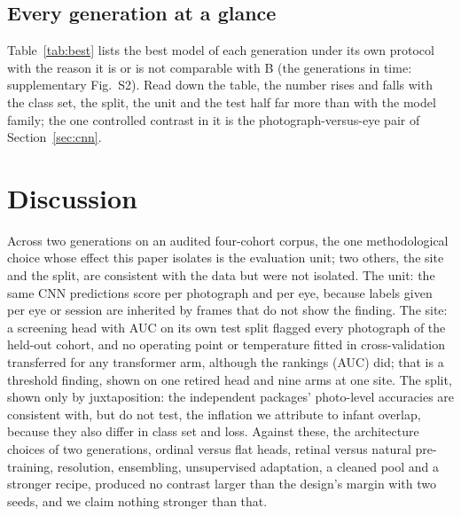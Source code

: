 \documentclass[journal]{IEEEtran}
\begin{document}
\subsection{Every generation at a glance}
Table~\ref{tab:best} lists the best model of each generation under its own protocol with the reason it is or is not comparable with B (the generations in time: supplementary Fig.~S2). Read down the table, the number rises and falls with the class set, the split, the unit and the test half far more than with the model family; the one controlled contrast in it is the photograph-versus-eye pair of Section~\ref{sec:cnn}.

\begin{table}[!t]
\caption{Every generation at a glance: the best model of each under its own protocol. Only one row is the project's selected model; every other row is listed with the reason its number cannot be read against it. Independent-package rows: four classes, photo-level split, test n\,=\,\mateTest{} (\mateMLTest{} for the classical package); CI: \mateCIkind{} (Wilson for the classical package).}
\label{tab:best}
\centering\scriptsize\setlength{\tabcolsep}{3.5pt}

\end{table}

\section{Discussion}\label{sec:discussion}
Across two generations on an audited four-cohort corpus, the one methodological choice whose effect this paper isolates is the evaluation unit; two others, the site and the split, are consistent with the data but were not isolated. The unit: the same CNN predictions score \vTwoLockedImgQ{} per photograph and \vTwoLockedEyeQ{} per eye, because labels given per eye or session are inherited by frames that do not show the finding. The site: a screening head with AUC \sweepAUC{} on its own test split flagged every photograph of the held-out cohort, and no operating point or temperature fitted in cross-validation transferred for any transformer arm, although the rankings (AUC) did; that is a threshold finding, shown on one retired head and nine arms at one site. The split, shown only by juxtaposition: the independent packages' photo-level accuracies are consistent with, but do not test, the inflation we attribute to infant overlap, because they also differ in class set and loss. Against these, the architecture choices of two generations, ordinal versus flat heads, retinal versus natural pre-training, resolution, ensembling, unsupervised adaptation, a cleaned pool and a stronger recipe, produced no contrast larger than the design's \mdd{} margin with two seeds, and we claim nothing stronger than that.
\end{document}
